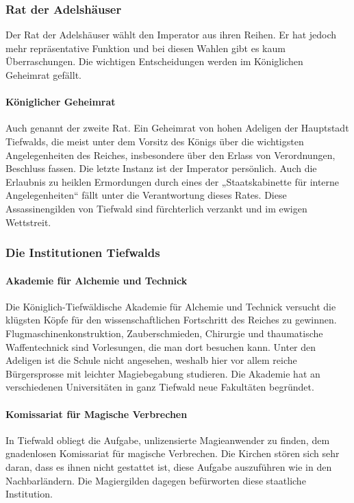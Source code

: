 \documentclass[12pt,twoside,twocolumn,openany]{book}
\begin{document}
\subsubsection{Rat der Adelshäuser}
Der Rat der Adelshäuser wählt den Imperator aus ihren Reihen. Er hat jedoch mehr repräsentative Funktion und bei diesen Wahlen gibt es kaum Überraschungen. Die wichtigen Entscheidungen werden im Königlichen Geheimrat gefällt.

\paragraph{Königlicher Geheimrat} Auch genannt der zweite Rat. Ein Geheimrat von hohen Adeligen der Hauptstadt Tiefwalds, die meist unter dem Vorsitz des Königs über die wichtigsten Angelegenheiten des Reiches, insbesondere über den Erlass von Verordnungen, Beschluss fassen. Die letzte Instanz ist der Imperator persönlich. Auch die Erlaubnis zu heiklen Ermordungen durch eines der „Staatskabinette für interne Angelegenheiten“ fällt unter die Verantwortung dieses Rates. Diese Assassinengilden von Tiefwald sind fürchterlich verzankt und im ewigen Wettstreit.




\subsubsection{Die Institutionen Tiefwalds}

\paragraph{Akademie für Alchemie und Technick} Die Königlich-Tiefwäldische Akademie für Alchemie und Technick versucht die klügsten Köpfe für den wissenschaftlichen Fortschritt des Reiches zu gewinnen. Flugmaschinenkonstruktion, Zauberschmieden, Chirurgie und thaumatische Waffentechnick sind Vorlesungen, die man dort besuchen kann. Unter den Adeligen ist die Schule nicht angesehen, weshalb hier vor allem reiche Bürgersprosse mit leichter Magiebegabung studieren. Die Akademie hat an verschiedenen Universitäten in ganz Tiefwald neue Fakultäten begründet.

\paragraph{Komissariat für Magische Verbrechen} In Tiefwald obliegt die Aufgabe, unlizensierte Magieanwender zu finden, dem gnadenlosen Komissariat für magische Verbrechen. Die Kirchen stören sich sehr daran, dass es ihnen nicht gestattet ist, diese Aufgabe auszuführen wie in den Nachbarländern. Die Magiergilden dagegen befürworten diese staatliche Institution.
\end{document}
